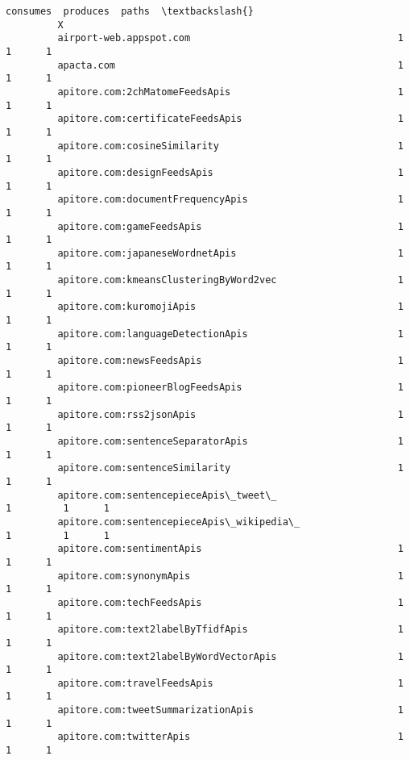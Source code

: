 \documentclass[11pt]{article}
\begin{document}
\begin{Verbatim}[commandchars=\\\{\}]
                                                             consumes  produces  paths  \textbackslash{}
         X                                                                               
         airport-web.appspot.com                                    1         1      1   
         apacta.com                                                 1         1      1   
         apitore.com:2chMatomeFeedsApis                             1         1      1   
         apitore.com:certificateFeedsApis                           1         1      1   
         apitore.com:cosineSimilarity                               1         1      1   
         apitore.com:designFeedsApis                                1         1      1   
         apitore.com:documentFrequencyApis                          1         1      1   
         apitore.com:gameFeedsApis                                  1         1      1   
         apitore.com:japaneseWordnetApis                            1         1      1   
         apitore.com:kmeansClusteringByWord2vec                     1         1      1   
         apitore.com:kuromojiApis                                   1         1      1   
         apitore.com:languageDetectionApis                          1         1      1   
         apitore.com:newsFeedsApis                                  1         1      1   
         apitore.com:pioneerBlogFeedsApis                           1         1      1   
         apitore.com:rss2jsonApis                                   1         1      1   
         apitore.com:sentenceSeparatorApis                          1         1      1   
         apitore.com:sentenceSimilarity                             1         1      1   
         apitore.com:sentencepieceApis\_tweet\_                       1         1      1   
         apitore.com:sentencepieceApis\_wikipedia\_                   1         1      1   
         apitore.com:sentimentApis                                  1         1      1   
         apitore.com:synonymApis                                    1         1      1   
         apitore.com:techFeedsApis                                  1         1      1   
         apitore.com:text2labelByTfidfApis                          1         1      1   
         apitore.com:text2labelByWordVectorApis                     1         1      1   
         apitore.com:travelFeedsApis                                1         1      1   
         apitore.com:tweetSummarizationApis                         1         1      1   
         apitore.com:twitterApis                                    1         1      1   

\end{Verbatim}
\end{document}
